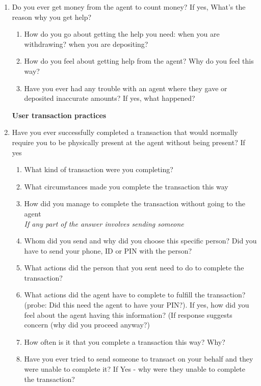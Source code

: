 \begin{appendices}
\begin{enumerate}
    \item Do you ever get money from the agent to count money? If yes, What's the reason why you get help?
    \begin{enumerate}
        \item How do you go about getting the help you need: when you are withdrawing? when you are depositing? 
        \item How do you feel about getting help from the agent? Why do you feel this way?
        \item Have you ever had any trouble with an agent where they gave or deposited inaccurate amounts? If yes, what happened? 
    \end{enumerate}
    

\textbf{User transaction practices}
    \item Have you ever successfully completed a transaction that would normally require you to be physically present at the agent without being present? If yes
    \begin{enumerate}
        \item What kind of transaction were you completing?
        \item What circumstances made you complete the transaction this way
        \item How did you manage to complete the transaction without going to the agent
        \medskip
        \\
        \textit{If any part of the answer involves sending someone}
        \item Whom did you send and why did you choose this specific person? Did you have to send your phone, ID or PIN with the person?
        \item What actions did the person that you sent need to do to complete the transaction?
        \item What actions did the agent have to complete to fulfill the transaction? (probe: Did this need the agent to have your PIN?). If yes, how did you feel about the agent having this information? (If response suggests concern (why did you proceed anyway?)
        \item How often is it that you complete a transaction this way? Why?
        \item Have you ever tried to send someone to transact on your behalf and they were unable to complete it? If Yes - why were they unable to complete the transaction? 
    \end{enumerate}


\end{enumerate}
\end{appendices}
